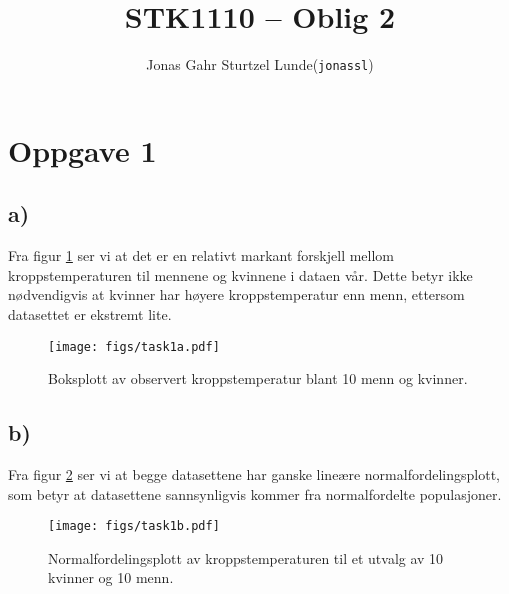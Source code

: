 \documentclass[12p,a4paper]{article}
\begin{document}
\title{STK1110 -- Oblig 2}
\author{
    \begin{tabular}{r l}
        Jonas Gahr Sturtzel Lunde & (\texttt{jonassl})
    \end{tabular}}

\maketitle

\hspace{10cm}



\section*{Oppgave 1}
\subsection*{a)}
Fra figur \ref{fig:1} ser vi at det er en relativt markant forskjell mellom kroppstemperaturen til mennene og kvinnene i dataen vår. Dette betyr ikke nødvendigvis at kvinner har høyere kroppstemperatur enn menn, ettersom datasettet er ekstremt lite.
\begin{figure}[H]
    \centering
    \texttt{[image: figs/task1a.pdf]}
    \caption{Boksplott av observert kroppstemperatur blant 10 menn og kvinner.}
    \label{fig:1}
\end{figure}




\subsection*{b)}
Fra figur \ref{fig:2} ser vi at begge datasettene har ganske lineære normalfordelingsplott, som betyr at datasettene sannsynligvis kommer fra normalfordelte populasjoner.
\begin{figure}[H]
    \centering
    \texttt{[image: figs/task1b.pdf]}
    \caption{Normalfordelingsplott av kroppstemperaturen til et utvalg av 10 kvinner og 10 menn.}
    \label{fig:2}
\end{figure}
\end{document}
